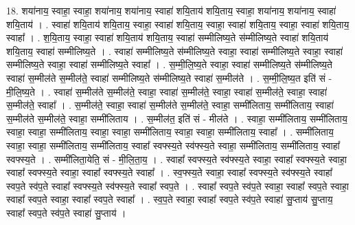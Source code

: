 \documentclass[17pt]{extarticle}
\begin{document}
18. शया॑नाय॒ स्वाहा॒ स्वाहा॒ शया॑नाय॒ शया॑नाय॒ स्वाहा॑ शयि॒ताय॑ शयि॒ताय॒ स्वाहा॒ शया॑नाय॒ शया॑नाय॒ स्वाहा॑ शयि॒ताय॑ । . स्वाहा॑ शयि॒ताय॑ शयि॒ताय॒ स्वाहा॒ स्वाहा॑ शयि॒ताय॒ स्वाहा॒ स्वाहा॑ शयि॒ताय॒ स्वाहा॒ स्वाहा॑ शयि॒ताय॒ स्वाहा᳚ । . श॒यि॒ताय॒ स्वाहा॒ स्वाहा॑ शयि॒ताय॑ शयि॒ताय॒ स्वाहा॑ सम्मीलिष्य॒ते स॑म्मीलिष्य॒ते स्वाहा॑ शयि॒ताय॑ शयि॒ताय॒ स्वाहा॑ सम्मीलिष्य॒ते । . स्वाहा॑ सम्मीलिष्य॒ते स॑म्मीलिष्य॒ते स्वाहा॒ स्वाहा॑ सम्मीलिष्य॒ते स्वाहा॒ स्वाहा॑ सम्मीलिष्य॒ते स्वाहा॒ स्वाहा॑ सम्मीलिष्य॒ते स्वाहा᳚ । . स॒म्मी॒लि॒ष्य॒ते स्वाहा॒ स्वाहा॑ सम्मीलिष्य॒ते स॑म्मीलिष्य॒ते स्वाहा॑ स॒म्मील॑ते स॒म्मील॑ते॒ स्वाहा॑ सम्मीलिष्य॒ते स॑म्मीलिष्य॒ते स्वाहा॑ स॒म्मील॑ते । . स॒म्मी॒लि॒ष्य॒त इति॑ सं - मी॒लि॒ष्य॒ते । . स्वाहा॑ स॒म्मील॑ते स॒म्मील॑ते॒ स्वाहा॒ स्वाहा॑ स॒म्मील॑ते॒ स्वाहा॒ स्वाहा॑ स॒म्मील॑ते॒ स्वाहा॒ स्वाहा॑ स॒म्मील॑ते॒ स्वाहा᳚ । . स॒म्मील॑ते॒ स्वाहा॒ स्वाहा॑ स॒म्मील॑ते स॒म्मील॑ते॒ स्वाहा॒ सम्मी॑लिताय॒ सम्मी॑लिताय॒ स्वाहा॑ स॒म्मील॑ते स॒म्मील॑ते॒ स्वाहा॒ सम्मी॑लिताय । . स॒म्मील॑त॒ इति॑ सं - मील॑ते । . स्वाहा॒ सम्मी॑लिताय॒ सम्मी॑लिताय॒ स्वाहा॒ स्वाहा॒ सम्मी॑लिताय॒ स्वाहा॒ स्वाहा॒ सम्मी॑लिताय॒ स्वाहा॒ स्वाहा॒ सम्मी॑लिताय॒ स्वाहा᳚ । . सम्मी॑लिताय॒ स्वाहा॒ स्वाहा॒ सम्मी॑लिताय॒ सम्मी॑लिताय॒ स्वाहा᳚ स्वफ्स्य॒ते स्व॑फ्स्य॒ते स्वाहा॒ सम्मी॑लिताय॒ सम्मी॑लिताय॒ स्वाहा᳚ स्वफ्स्य॒ते । . सम्मी॑लिता॒येति॒ सं - मी॒लि॒ता॒य॒ । . स्वाहा᳚ स्वफ्स्य॒ते स्व॑फ्स्य॒ते स्वाहा॒ स्वाहा᳚ स्वफ्स्य॒ते स्वाहा॒ स्वाहा᳚ स्वफ्स्य॒ते स्वाहा॒ स्वाहा᳚ स्वफ्स्य॒ते स्वाहा᳚ । . स्व॒फ्स्य॒ते स्वाहा॒ स्वाहा᳚ स्वफ्स्य॒ते स्व॑फ्स्य॒ते स्वाहा᳚ स्वप॒ते स्व॑प॒ते स्वाहा᳚ स्वफ्स्य॒ते स्व॑फ्स्य॒ते स्वाहा᳚ स्वप॒ते । . स्वाहा᳚ स्वप॒ते स्व॑प॒ते स्वाहा॒ स्वाहा᳚ स्वप॒ते स्वाहा॒ स्वाहा᳚ स्वप॒ते स्वाहा॒ स्वाहा᳚ स्वप॒ते स्वाहा᳚ । . स्व॒प॒ते स्वाहा॒ स्वाहा᳚ स्वप॒ते स्व॑प॒ते स्वाहा॑ सु॒प्ताय॑ सु॒प्ताय॒ स्वाहा᳚ स्वप॒ते स्व॑प॒ते स्वाहा॑ सु॒प्ताय॑ । \newline
\end{document}
